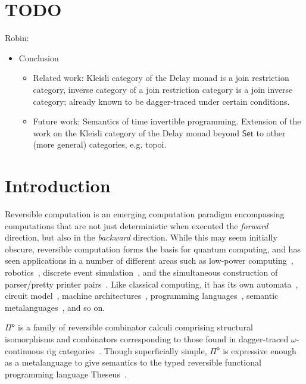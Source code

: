 \documentclass[runningheads,a4paper]{llncs}
\newcommand{\Pio}{\ensuremath{\mathsf{\Pi}^{\mathsf{o}}}}
\newcommand{\Set}{\mathsf{Set}}
\begin{document}
\section{TODO} %
\label{sec:todo}
Robin:
\begin{itemize}
  \item Conclusion
  \begin{itemize}
    \item Related work: Kleisli category of the Delay monad is a join
    restriction category, inverse category of a join restriction category is a
    join inverse category; already known to be dagger-traced under certain
    conditions.
    \item Future work: Semantics of time invertible programming. Extension of
    the work on the Kleisli category of the Delay monad beyond $\Set$ to other
    (more general) categories, e.g. topoi.
  \end{itemize}
\end{itemize}


\section{Introduction}\label{sec:intro}
Reversible computation is an emerging computation paradigm encompassing
computations that are not just deterministic when executed the \emph{forward}
direction, but also in the \emph{backward} direction. While this may seem
initially obscure, reversible computation forms the basis for quantum
computing, and has seen applications in a number of different areas such as
low-power computing~\cite{Landauer61}, robotics~\cite{SchultzLE18}, discrete
event simulation~\cite{Schordan15}, and the simultaneous construction of
parser/pretty printer pairs~\cite{RendelO10}. Like classical computing, it has
its own automata~\cite{Bennett73}, circuit model~\cite{DeVos10}, machine
architectures~\cite{ThomsenAG11}, programming
languages~\cite{JamesS12,JamesS14,YokoyamaG07,Schultz18,JacobsenKT18}, semantic
metalanguages~\cite{Giles,KaarsgaardAG17,KaarsgaardG18}, and so on.

\Pio{} is a family of reversible combinator calculi comprising structural
isomorphisms and combinators corresponding to those found in dagger-traced
$\omega$-continuous rig categories~\cite{Karvonen19}. Though superficially
simple, \Pio{} is expressive enough as a metalanguage to give semantics to the
typed reversible functional programming language Theseus~\cite{JamesS14}.
\end{document}
